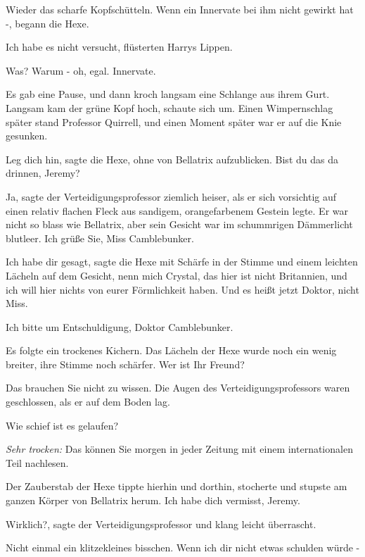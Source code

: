 Wieder das scharfe Kopfschütteln. \glqq{}Wenn ein Innervate bei ihm nicht gewirkt
hat -\grqq{}, begann die Hexe.

\glqq{}Ich habe es nicht versucht\grqq{}, flüsterten Harrys Lippen.

\glqq{}Was? Warum - oh, egal. Innervate.\grqq{}

Es gab eine Pause, und dann kroch langsam eine Schlange aus ihrem Gurt. Langsam
kam der grüne Kopf hoch, schaute sich um. Einen Wimpernschlag später stand
Professor Quirrell, und einen Moment später war er auf die Knie gesunken.

\glqq{}Leg dich hin\grqq{}, sagte die Hexe, ohne von Bellatrix aufzublicken.
\glqq{}Bist du das da drinnen, Jeremy?\grqq{}

\glqq{}Ja\grqq{}, sagte der Verteidigungsprofessor ziemlich heiser, als er sich
vorsichtig auf einen relativ flachen Fleck aus sandigem, orangefarbenem Gestein
legte. Er war nicht so blass wie Bellatrix, aber sein Gesicht war im schummrigen
Dämmerlicht blutleer. \glqq{}Ich grüße Sie, Miss Camblebunker.\grqq{}

\glqq{}Ich habe dir gesagt\grqq{}, sagte die Hexe mit Schärfe in der Stimme und
einem leichten Lächeln auf dem Gesicht, \glqq{}nenn mich Crystal, das hier ist
nicht Britannien, und ich will hier nichts von eurer Förmlichkeit haben. Und es
heißt jetzt Doktor, nicht Miss.\grqq{}

\glqq{}Ich bitte um Entschuldigung, Doktor Camblebunker.\grqq{}

Es folgte ein trockenes Kichern. Das Lächeln der Hexe wurde noch ein wenig
breiter, ihre Stimme noch schärfer. \glqq{}Wer ist Ihr Freund?\grqq{}

\glqq{}Das brauchen Sie nicht zu wissen.\grqq{} Die Augen des
Verteidigungsprofessors waren geschlossen, als er auf dem Boden lag.

\glqq{}Wie schief ist es gelaufen?\grqq{}

\emph{Sehr trocken:} \glqq{}Das können Sie morgen in jeder Zeitung mit einem
internationalen Teil nachlesen.\grqq{}

Der Zauberstab der Hexe tippte hierhin und dorthin, stocherte und stupste am
ganzen Körper von Bellatrix herum. \glqq{}Ich habe dich vermisst, Jeremy.\grqq{}

\glqq{}Wirklich?\grqq{}, sagte der Verteidigungsprofessor und klang leicht
überrascht.

\glqq{}Nicht einmal ein klitzekleines bisschen. Wenn ich dir nicht etwas schulden
würde -\grqq{}

